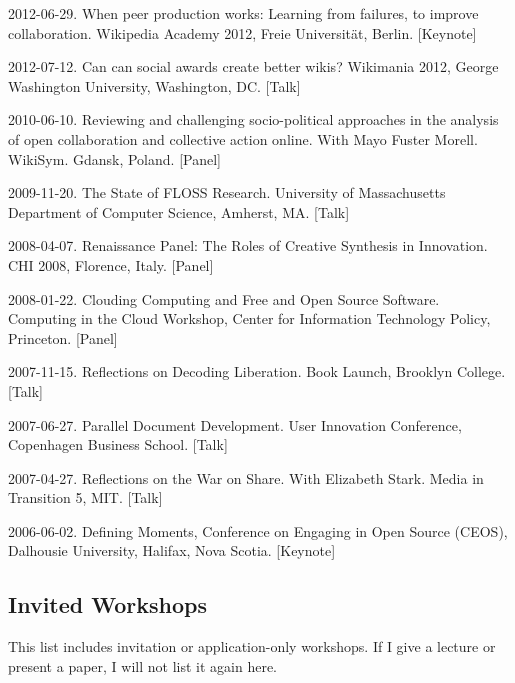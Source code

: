 \documentclass[10pt]{article}
\newenvironment{cvlist}{
\begin{list}{}{\leftmargin=3.0em \itemindent=-3.0em}
  \setlength{\itemsep}{0pt}
  \setlength{\parskip}{0em}
  \setlength{\parsep}{1em}
  \setlength{\parindent}{0em}}
{\vspace{1em}
\end{list}}
\begin{document}
\begin{cvlist}
\item 2012-06-29. When peer production works: Learning from failures, to improve collaboration. Wikipedia Academy 2012, Freie Universität, Berlin. [Keynote]
\item 2012-07-12. Can can social awards create better wikis? Wikimania 2012, George Washington University, Washington, DC. [Talk]
\item 2010-06-10. Reviewing and challenging socio-political approaches in the analysis of open collaboration and collective action online. With Mayo Fuster Morell. WikiSym. Gdansk, Poland. [Panel]
\item 2009-11-20. The State of FLOSS Research. University of Massachusetts Department of Computer Science, Amherst, MA. [Talk]
\item 2008-04-07. Renaissance Panel: The Roles of Creative Synthesis in Innovation. CHI 2008, Florence, Italy. [Panel]
\item 2008-01-22. Clouding Computing and Free and Open Source Software. Computing in the Cloud Workshop, Center for Information Technology Policy, Princeton. [Panel]
\item 2007-11-15. Reflections on Decoding Liberation. Book Launch, Brooklyn College. [Talk]
\item 2007-06-27. Parallel Document Development. User Innovation Conference, Copenhagen Business School. [Talk]
\item 2007-04-27. Reflections on the War on Share. With Elizabeth Stark. Media in Transition 5, MIT. [Talk]
\item 2006-06-02. Defining Moments, Conference on Engaging in Open Source (CEOS), Dalhousie University, Halifax, Nova Scotia. [Keynote]
\end{cvlist}

\subsection{Invited Workshops}

This list includes invitation or application-only workshops. If I give a lecture or present a paper, I will not list it again here.
\end{document}
